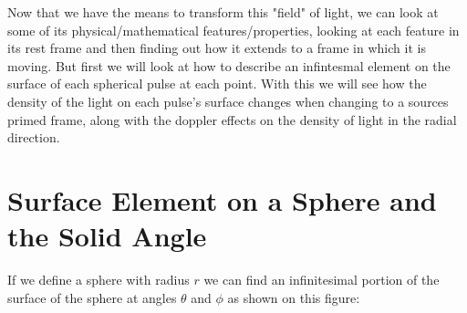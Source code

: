 Now that we have the means to transform this "field" of light, we can look at some of its physical/mathematical features/properties, looking at each feature in its rest frame and then finding out how it extends to a frame in which it is moving.
But first we will look at how to describe an infintesmal element on the surface of each spherical pulse at each point.
With this we will see how the density of the light on each pulse's surface changes when changing to a sources primed frame, along with the doppler effects on the density of light in the radial direction.

\section{Surface Element on a Sphere and the Solid Angle} \label{subsect: Surface Element on a Sphere}

If we define a sphere with radius $r$ we can find an infinitesimal portion of the surface of the sphere at angles ${\theta}$ and ${\phi}$ as shown on this figure:

